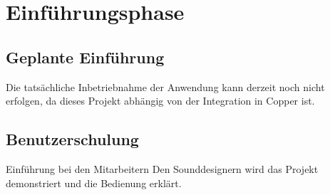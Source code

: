 \section{Einführungsphase}
\label{sec:Einfuehrungsphase}
\subsection{Geplante Einführung}
\label{subsec:EinführungGeplant}
Die tatsächliche Inbetriebnahme der Anwendung kann derzeit noch nicht erfolgen, da dieses Projekt abhängig von der Integration in Copper ist.

\subsection{Benutzerschulung} Einführung bei den Mitarbeitern
Den Sounddesignern wird das Projekt demonstriert und die Bedienung erklärt.

